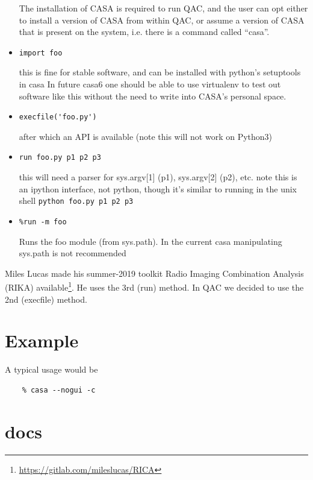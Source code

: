 \documentclass[11pt,twoside]{article}
\begin{document}
\begin{itemize}
The installation of CASA is required to run QAC, and the user can opt either to install a version
of CASA from within QAC, or assume a version of CASA that is present on the system, i.e. there
is a command called ``casa''.




  \item \verb+import foo+ 

    this is fine for stable software, and can be installed with python's setuptools in casa
    In future casa6 one should be able to use virtualenv to test out software like this
    without the need to write into CASA's personal space.

  \item \verb+execfile('foo.py')+ 

    after which an API is available  (note this will not work on Python3)

  \item  \verb+run foo.py p1 p2 p3+ 

    this will need a parser for sys.argv[1] (p1), sys.argv[2] (p2), etc.
    note this is an ipython interface, not python, though it's similar to
    running in the unix shell \verb+python foo.py p1 p2 p3+
                           
  \item   \verb+%run -m foo+

    Runs the foo module (from sys.path). In the current casa manipulating sys.path is
    not  recommended

  \end{itemize}

Miles Lucas made his summer-2019 toolkit Radio Imaging Combination Analysis (RIKA)
available\footnote{\url{https://gitlab.com/mileslucas/RICA}}. He uses the 3rd (run) method.
In QAC we decided to use the 2nd (execfile) method.



\section{Example}

A typical usage would be

\begin{verbatim}
    % casa --nogui -c 
\end{verbatim}


\section{docs}
\end{document}
